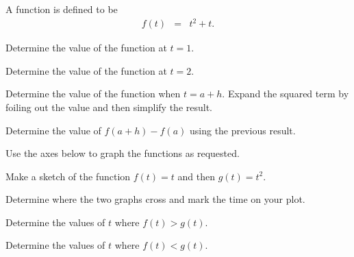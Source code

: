 \begin{problem}
\item A function is defined to be
  \begin{eqnarray*}
    f(t) & = & t^2 + t.
  \end{eqnarray*}
  \begin{subproblem}
  \item Determine the value of the function at $t=1$.
    \vfill
  \item Determine the value of the function at $t=2$.
    \vfill
  \item Determine the value of the function when $t=a+h$. Expand the
    squared term by foiling out the value and then simplify the
    result.
    \vfill
  \item Determine the value of $f(a+h)-f(a)$ using the previous
    result.
    \vfill
  \end{subproblem}

  \clearpage

\item Use the axes below to graph the functions as requested.

  \scalebox{0.7}{}

  \begin{subproblem}
  \item Make a sketch of the function $f(t)=t$ and then $g(t)=t^2$.
  \item Determine where the two graphs cross and mark the time on your
    plot.
    \clearpage
  \item Determine the values of $t$ where $f(t)>g(t)$.
    \vfill
  \item Determine the values of $t$ where $f(t)<g(t)$.
    \vfill
  \end{subproblem}


\end{problem}


